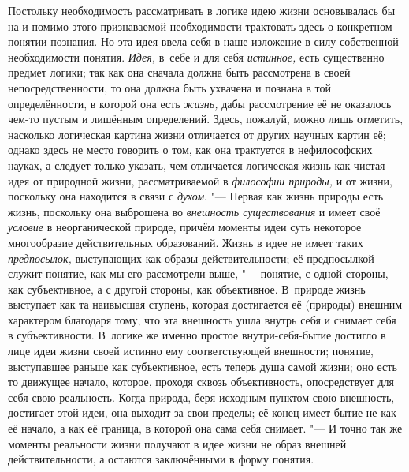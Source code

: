 Постольку необходимость рассматривать в логике идею жизни
основывалась бы на и помимо этого признаваемой необходимости трактовать
здесь о конкретном понятии познания. Но эта идея ввела себя в наше
изложение в силу собственной необходимости понятия.
{\em Идея,} в~себе и для
себя {\em истинное,} есть
существенно предмет логики; так как она сначала должна быть рассмотрена в
своей непосредственности, то она должна быть ухвачена и познана в той
определённости, в которой она есть
{\em жизнь,} дабы
рассмотрение её не оказалось чем-то пустым и лишённым определений. Здесь,
пожалуй, можно лишь отметить, насколько логическая картина жизни отличается
от других научных картин её; однако здесь не место говорить о том, как она
трактуется в нефилософских науках, а следует только указать, чем отличается
логическая жизнь как чистая идея от природной жизни, рассматриваемой в
{\em философии природы,}
и от жизни, поскольку она находится в связи с
{\em духом}. "--- Первая как
жизнь природы есть жизнь, поскольку она выброшена во
{\em внешность существования}
и имеет своё
{\em условие} в
неорганической природе, причём моменты идеи суть некоторое многообразие
действительных образований. Жизнь в идее не имеет таких
{\em предпосылок,}
выступающих как образы действительности; её предпосылкой
служит понятие, как мы его рассмотрели выше, "--- понятие, с
одной стороны, как субъективное, а с другой стороны, как объективное.
В~природе жизнь выступает как та наивысшая ступень, которая достигается её
(природы) внешним характером благодаря тому, что эта внешность ушла внутрь
себя и снимает себя в субъективности. В~логике же именно простое
внутри-себя-бытие достигло в лице идеи жизни своей истинно ему
соответствующей внешности; понятие, выступавшее раньше как субъективное,
есть теперь душа самой жизни; оно есть то движущее начало, которое, проходя
сквозь объективность, опосредствует для себя свою реальность. Когда
природа, беря исходным пунктом свою внешность, достигает этой идеи, она
выходит за свои пределы; её конец имеет бытие не как её начало, а как её
граница, в которой она сама себя снимает. "--- И точно так же
моменты реальности жизни получают в идее жизни не образ
внешней действительности, а остаются заключёнными в форму понятия.


